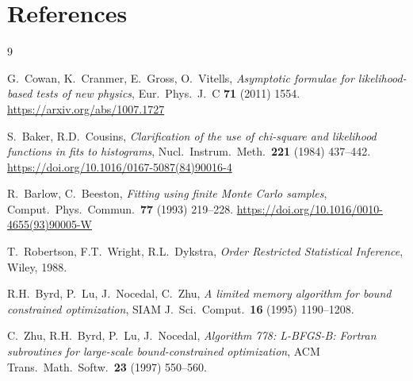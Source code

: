 \documentclass[12pt,a4paper]{article}
\begin{document}
\section*{References}
\begin{thebibliography}{9}

G.~Cowan, K.~Cranmer, E.~Gross, O.~Vitells,
\textit{Asymptotic formulae for likelihood-based tests of new physics},
Eur.\ Phys.\ J.\ C \textbf{71} (2011) 1554.
\url{https://arxiv.org/abs/1007.1727}

S.~Baker, R.D.~Cousins,
\textit{Clarification of the use of chi-square and likelihood functions in fits to histograms},
Nucl.\ Instrum.\ Meth.\ \textbf{221} (1984) 437--442.
\url{https://doi.org/10.1016/0167-5087(84)90016-4}

R.~Barlow, C.~Beeston,
\textit{Fitting using finite Monte Carlo samples},
Comput.\ Phys.\ Commun.\ \textbf{77} (1993) 219--228.
\url{https://doi.org/10.1016/0010-4655(93)90005-W}

T.~Robertson, F.T.~Wright, R.L.~Dykstra,
\textit{Order Restricted Statistical Inference},
Wiley, 1988.

R.H.~Byrd, P.~Lu, J.~Nocedal, C.~Zhu,
\textit{A limited memory algorithm for bound constrained optimization},
SIAM J.\ Sci.\ Comput.\ \textbf{16} (1995) 1190--1208.

C.~Zhu, R.H.~Byrd, P.~Lu, J.~Nocedal,
\textit{Algorithm 778: L-BFGS-B: Fortran subroutines for large-scale bound-constrained optimization},
ACM Trans.\ Math.\ Softw.\ \textbf{23} (1997) 550--560.

\end{thebibliography}
\end{document}

